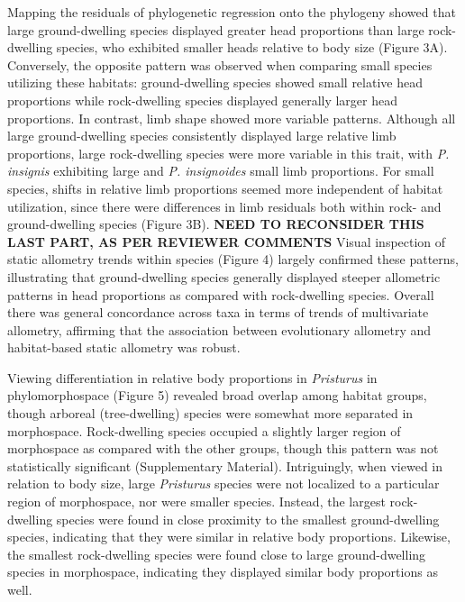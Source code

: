\documentclass[
  11pt,
]{article}
\begin{document}
Mapping the residuals of phylogenetic regression onto the phylogeny
showed that large ground-dwelling species displayed greater head
proportions than large rock-dwelling species, who exhibited smaller
heads relative to body size (Figure 3A). Conversely, the opposite
pattern was observed when comparing small species utilizing these
habitats: ground-dwelling species showed small relative head proportions
while rock-dwelling species displayed generally larger head proportions.
In contrast, limb shape showed more variable patterns. Although all
large ground-dwelling species consistently displayed large relative limb
proportions, large rock-dwelling species were more variable in this
trait, with \emph{P. insignis} exhibiting large and \emph{P.
insignoides} small limb proportions. For small species, shifts in
relative limb proportions seemed more independent of habitat
utilization, since there were differences in limb residuals both within
rock- and ground-dwelling species (Figure 3B). \textbf{NEED TO
RECONSIDER THIS LAST PART, AS PER REVIEWER COMMENTS} Visual inspection
of static allometry trends within species (Figure 4) largely confirmed
these patterns, illustrating that ground-dwelling species generally
displayed steeper allometric patterns in head proportions as compared
with rock-dwelling species. Overall there was general concordance across
taxa in terms of trends of multivariate allometry, affirming that the
association between evolutionary allometry and habitat-based static
allometry was robust. \hfill\break

Viewing differentiation in relative body proportions in \emph{Pristurus}
in phylomorphospace (Figure 5) revealed broad overlap among habitat
groups, though arboreal (tree-dwelling) species were somewhat more
separated in morphospace. Rock-dwelling species occupied a slightly
larger region of morphospace as compared with the other groups, though
this pattern was not statistically significant (Supplementary Material).
Intriguingly, when viewed in relation to body size, large
\emph{Pristurus} species were not localized to a particular region of
morphospace, nor were smaller species. Instead, the largest
rock-dwelling species were found in close proximity to the smallest
ground-dwelling species, indicating that they were similar in relative
body proportions. Likewise, the smallest rock-dwelling species were
found close to large ground-dwelling species in morphospace, indicating
they displayed similar body proportions as well. \hfill\break
\end{document}
